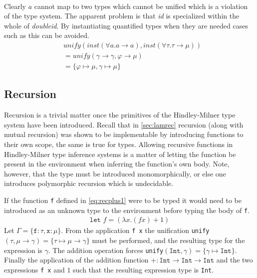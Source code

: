 \begin{exmp}
\begin{align}
\end{align}
    Clearly $a$ cannot map to two types which cannot be unified which is a violation of the type system.
    The apparent problem is that \textit{id} is specialized within the whole of \textit{doubleid}.
    By instantiating quantified types when they are needed cases such as this can be avoided.
    \begin{align}
        &\textit{unify}(\textit{inst}(\forall a . a \rightarrow a), \textit{inst}(\forall \tau . \tau \rightarrow \mu))\\
        & = \textit{unify}(\gamma \rightarrow \gamma, \varphi \rightarrow \mu) \tag*{}\\
        & = \{ \varphi \mapsto \mu, \gamma \mapsto \mu \} \tag*{}
    \end{align}
\end{exmp}
\subsection{Recursion}
Recursion is a trivial matter once the primitives of the Hindley-Milner type system have been introduced.
Recall that in \autoref{sec:lamrec} recursion (along with mutual recursion) was shown to be implementable by introducing functions to their own scope, the same is true for types.
Allowing recursive functions in Hindley-Milner type inference systems is a matter of letting the function be present in the environment when inferring the function's own body.
Note, however, that the type must be introduced monomorphically, or else one introduces polymorphic recursion which is undecidable.
\begin{exmp}
If the function \texttt{f} defined in \autoref{eq:recplus1} were to be typed it would need to be introduced as an unknown type to the environment before typing the body of \texttt{f}.
\begin{align}
  \texttt{let } f = (\lambda x. (f x) + 1) \label{eq:recplus1}
\end{align}
Let $\Gamma = \{ \texttt{f} : \tau, \texttt{x} :  \mu \}$.
From the application \texttt{f x} the unification \texttt{unify}$(\tau, \mu \rightarrow \gamma) = \{ \tau \mapsto \mu \rightarrow \gamma \}$ must be performed, and the resulting type for the expression is $\gamma$.
The addition operation forces \texttt{unify}$(\texttt{Int}, \gamma) = \{ \gamma \mapsto \texttt{Int} \}$.
Finally the application of the addition function $+: \texttt{Int} \rightarrow \texttt{Int} \rightarrow \texttt{Int}$ and the two expressions \texttt{f x} and $1$ such that the resulting expression type is \texttt{Int}.

\end{exmp}


